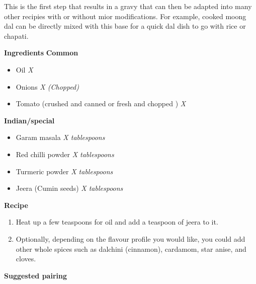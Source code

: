 This is the first step that results in a gravy that can then be adapted into many other recipies with or without mior modifications. For example, cooked moong dal can be directly mixed with this base for a quick dal dish to go with rice or chapati.

\large{\textbf{Ingredients}}
  \large{\textbf{Common}}
  \begin{itemize}
    \item Oil \quad\quad\quad\quad \textit{X}
    \item Onions \quad\quad\quad\quad \textit{X (Chopped)}
    \item Tomato (crushed and canned or fresh and chopped ) \quad\quad\quad\quad \textit{X}
  \end{itemize}
  \large{\textbf{Indian/special}}
  \begin{itemize}
    \item Garam masala \quad\quad\quad\quad \textit{X tablespoons}
    \item Red chilli powder \quad\quad\quad\quad \textit{X tablespoons}
    \item Turmeric powder \quad\quad\quad\quad \textit{X tablespoons}
    \item Jeera (Cumin seeds) \quad\quad\quad\quad \textit{X tablespoons}
  \end{itemize}

\large{\textbf{Recipe}}

\begin{enumerate}
  \item Heat up a few teaspoons for oil and add a teaspoon of jeera to it.
  \item Optionally, depending on the flavour profile you would like, you could add other whole spices such as dalchini (cinnamon), cardamom, star anise, and cloves.
\end{enumerate}

\large{\textbf{Suggested pairing}}
